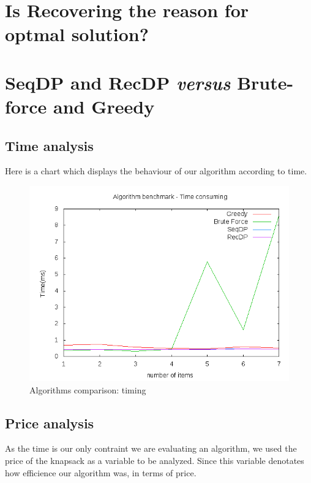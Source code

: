\documentclass{article}
\begin{document}
\section{Is Recovering the reason for optmal solution?}          

\section{SeqDP and RecDP \textit{versus} Brute-force and Greedy}

\subsection{Time analysis}

Here is a chart which displays the behaviour of our algorithm according to time.

\begin{figure}
\includegraphics[scale=0.4]{report/time_analysis}
\caption{Algorithms comparison: timing}
\label{report/time_analysis}
\end{figure}

\subsection{Price analysis}

As the time is our only contraint we are evaluating an algorithm, we used the price of the knapsack
as a variable to be analyzed. Since this variable denotates how efficience our algorithm was, in terms 
of price.
\end{document}
